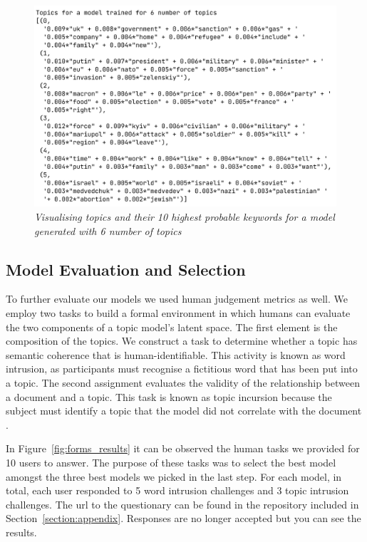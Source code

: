 \documentclass[twoside,12pt,a4paper]{article}
\begin{document}
\begin{figure}[h]
\centering
\includegraphics[scale=0.4]{visualise_topics.png}
\caption{\textit{Visualising topics and their 10 highest probable keywords for a model generated with 6 number of topics}}
\label{fig:visualise_topics}
\end{figure}

\subsection{Model Evaluation and Selection}
To further evaluate our models we used human judgement metrics as well. We employ two tasks to build a formal environment in which humans can evaluate the two components of a topic model's latent space. The first element is the composition of the topics. We construct a task to determine whether a topic has semantic coherence that is human-identifiable. This activity is known as word intrusion, as participants must recognise a fictitious word that has been put into a topic. The second assignment evaluates the validity of the relationship between a document and a topic. This task is known as topic incursion because the subject must identify a topic that the model did not correlate with the document \citep{nikolenko_topic_2017}.

In Figure~\ref{fig:forms_results} it can be observed the human tasks we provided for 10 users to answer. The purpose of these tasks was to select the best model amongst the three best models we picked in the last step. For each model, in total, each user responded to 5 word intrusion challenges and 3 topic intrusion challenges. The url to the questionary can be found in the repository included in Section~\ref{section:appendix}. Responses are no longer accepted but you can see the results.
\end{document}
